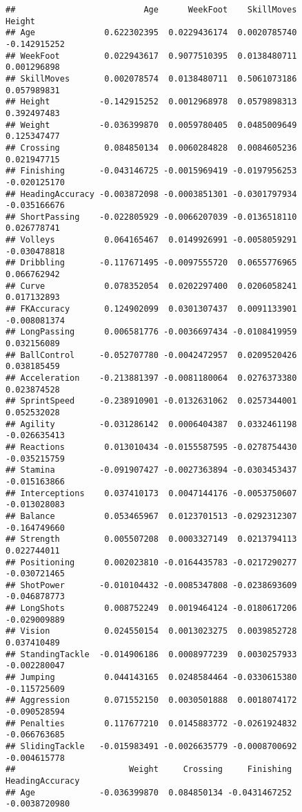 \documentclass[
]{article}
\begin{document}
\begin{verbatim}
##                          Age      WeekFoot    SkillMoves       Height
## Age              0.622302395  0.0229436174  0.0020785740 -0.142915252
## WeekFoot         0.022943617  0.9077510395  0.0138480711  0.001296898
## SkillMoves       0.002078574  0.0138480711  0.5061073186  0.057989831
## Height          -0.142915252  0.0012968978  0.0579898313  0.392497483
## Weight          -0.036399870  0.0059780405  0.0485009649  0.125347477
## Crossing         0.084850134  0.0060284828  0.0084605236  0.021947715
## Finishing       -0.043146725 -0.0015969419 -0.0197956253 -0.020125170
## HeadingAccuracy -0.003872098 -0.0003851301 -0.0301797934 -0.035166676
## ShortPassing    -0.022805929 -0.0066207039 -0.0136518110  0.026778741
## Volleys          0.064165467  0.0149926991 -0.0058059291 -0.030478818
## Dribbling       -0.117671495 -0.0097555720  0.0655776965  0.066762942
## Curve            0.078352054  0.0202297400  0.0206058241  0.017132893
## FKAccuracy       0.124902099  0.0301307437  0.0091133901 -0.008081374
## LongPassing      0.006581776 -0.0036697434 -0.0108419959  0.032156089
## BallControl     -0.052707780 -0.0042472957  0.0209520426  0.038185459
## Acceleration    -0.213881397 -0.0081180064  0.0276373380  0.023874528
## SprintSpeed     -0.238910901 -0.0132631062  0.0257344001  0.052532028
## Agility         -0.031286142  0.0006404387  0.0332461198 -0.026635413
## Reactions        0.013010434 -0.0155587595 -0.0278754430 -0.035215759
## Stamina         -0.091907427 -0.0027363894 -0.0303453437 -0.015163866
## Interceptions    0.037410173  0.0047144176 -0.0053750607 -0.013028083
## Balance          0.053465967  0.0123701513 -0.0292312307 -0.164749660
## Strength         0.005507208  0.0003327149  0.0213794113  0.022744011
## Positioning      0.002023810 -0.0164435783 -0.0217290277 -0.030721465
## ShotPower       -0.010104432 -0.0085347808 -0.0238693609 -0.046878773
## LongShots        0.008752249  0.0019464124 -0.0180617206 -0.029009889
## Vision           0.024550154  0.0013023275  0.0039852728  0.037410489
## StandingTackle  -0.014906186  0.0008977239  0.0030257933 -0.002280047
## Jumping          0.044143165  0.0248584464 -0.0330615380 -0.115725609
## Aggression       0.071552150  0.0030501888  0.0018074172 -0.090528594
## Penalties        0.117677210  0.0145883772 -0.0261924832 -0.066763685
## SlidingTackle   -0.015983491 -0.0026635779 -0.0008700692 -0.004615778
##                       Weight     Crossing     Finishing HeadingAccuracy
## Age             -0.036399870  0.084850134 -0.0431467252   -0.0038720980

\end{verbatim}
\end{document}
